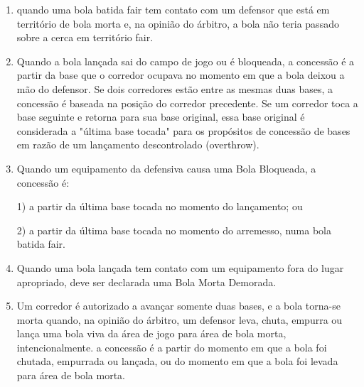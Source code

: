 \begin{enumerate}[label=\roman*.]
\begin{enumerate}[label=\roman*.]
\begin{enumerate}[label=\arabic*)]
				(b) por um corredor, depois de ter passado um defensor, exceto arremessador, e desde que nenhum outro defensor tenha tido uma chance de fazer um \gls{out} e a bola tenha ficado fora de jogo em território \gls{foul}.

		\item  quando uma bola batida \gls{fair} tem contato com um defensor que está em  território de bola morta e, na opinião do árbitro, a bola não teria passado sobre a cerca em território \gls{fair}.


			\item Quando a bola lançada sai do campo de jogo ou é bloqueada, a concessão é a partir da base que o corredor ocupava no momento em que a bola deixou a
			 mão do defensor. Se dois corredores estão entre as mesmas duas bases, a concessão é baseada na posição do corredor precedente. Se um corredor toca
			 a base seguinte e retorna para sua base original, essa base original é considerada a "última base tocada" para os propósitos de concessão de bases
			 em razão de um lançamento descontrolado (\gls{overthrow}).

			\item Quando um equipamento da defensiva causa uma Bola Bloqueada, a concessão é:

				 	1) a partir da última base tocada no momento do lançamento; ou

					2) a partir da última base tocada no momento do arremesso, numa bola batida \gls{fair}.

			\item  Quando uma bola lançada tem contato com um equipamento fora do lugar apropriado, deve ser declarada uma Bola Morta Demorada.
			\item Um corredor é autorizado a avançar somente duas bases, e a bola torna-se  morta quando, na opinião do árbitro, um defensor leva, chuta, empurra ou lança uma bola viva da área de jogo para área de bola morta, intencionalmente. a  concessão é a partir do momento em que a bola foi chutada, empurrada ou lançada, ou do momento em que a bola foi levada para área de bola morta.
		\end{enumerate}
	\end{enumerate}


\end{enumerate}
